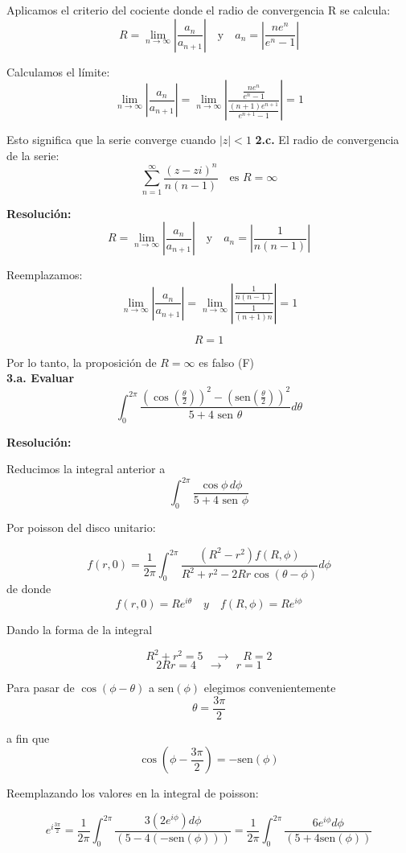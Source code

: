 \documentclass[a4paper,12pt]{article}
\begin{document}
Aplicamos el criterio del cociente donde el radio de convergencia R se calcula:
\[
R = \lim_{n\rightarrow\infty} \left| \frac{a_n}{a_{n+1}} \right| \quad \text{y} \quad a_n = \left| \frac{ne^n}{e^n - 1} \right|
\]

Calculamos el límite:
\[
\lim_{n\rightarrow\infty} \left| \frac{a_n}{a_{n+1}} \right| = \lim_{n\rightarrow\infty} \left| \frac{\frac{ne^n}{e^n - 1}}{\frac{(n+1)e^{n+1}}{e^{n+1} - 1}} \right| = 1
\]

Esto significa que la serie converge cuando $|z| < 1$
\textbf{2.c.} El radio de convergencia de la serie:
\[
\sum_{n=1}^{\infty} \frac{(z-zi)^n}{n(n-1)} \quad \text{es } R = \infty
\]

\textbf{Resolución:}
\[
R = \lim_{n\rightarrow\infty} \left| \frac{a_n}{a_{n+1}} \right| \quad \text{y} \quad a_n = \left| \frac{1}{n(n-1)} \right|
\]

Reemplazamos:
\[
\lim_{n\rightarrow\infty} \left| \frac{a_n}{a_{n+1}} \right| = \lim_{n\rightarrow\infty} \left| \frac{\frac{1}{n(n-1)}}{\frac{1}{(n+1)n}} \right| = 1
\]

\[
R = 1
\]

Por lo tanto, la proposición de $R = \infty$ es falso (F)\\
\textbf{3.a. Evaluar}
\[
\int_{0}^{2\pi} \frac{(\cos(\frac{\theta}{2}))^2 - (\text{sen}(\frac{\theta}{2}))^2}{5 + 4\text{ sen }\theta} d\theta
\]

\textbf{Resolución:}

Reducimos la integral anterior a
\[
\int_{0}^{2\pi} \frac{\cos \phi \, d\phi}{5 + 4\text{ sen }\phi}
\]

Por poisson del disco unitario:

\[
f(r, 0) = \frac{1}{2\pi} \int_{0}^{2\pi} \frac{(R^2 - r^2) f(R, \phi)}{R^2 + r^2 - 2Rr\cos(\theta - \phi)} d\phi
\]
de donde 
\[
f(r, 0) = Re^{i\theta} \quad y \quad f(R, \phi) = Re^{i\phi}
\]

Dando la forma de la integral

\[
R^2 + r^2 = 5 \quad \rightarrow \quad R = 2
\]
\[
2Rr = 4 \quad \rightarrow \quad r = 1
\]

Para pasar de $\cos(\phi - \theta)$ a $\text{sen}(\phi)$ elegimos convenientemente
\[
\theta = \frac{3\pi}{2}
\]

a fin que
\[
\cos(\phi - \frac{3\pi}{2}) = -\text{sen}(\phi)
\]

Reemplazando los valores en la integral de poisson:

\[
e^{i\frac{3\pi}{2}} = \frac{1}{2\pi} \int_{0}^{2\pi} \frac{3(2e^{i\phi}) d\phi}{(5 - 4(-\text{sen}(\phi)))} = \frac{1}{2\pi} \int_{0}^{2\pi} \frac{6e^{i\phi} d\phi}{(5 + 4\text{sen}(\phi))}
\]
\end{document}
